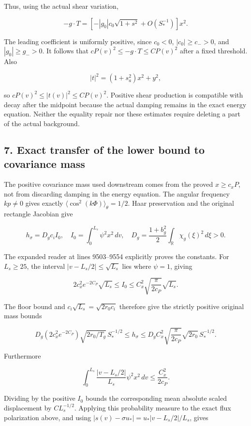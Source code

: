 \documentclass[10pt,a4paper]{article}
\begin{document}
Thus, using the actual shear variation,

\[
-g\cdot T=
\left[-|g_0|c_0\sqrt{1+s^2}+O(S_*^{-1})\right]x^2.
\]

The leading coefficient is uniformly positive, since \(c_0<0\), \(|c_0|\ge c_->0\), and \(|g_0|\ge g_->0\). It follows that \(cP(v)^2\le-g\cdot T\le CP(v)^2\) after a fixed threshold. Also

\[
|t|^2=(1+s_a^2)x^2+y^2,
\]

so \(cP(v)^2\le|t(v)|^2\le CP(v)^2\). Positive shear production is compatible with decay after the midpoint because the actual damping remains in the exact energy equation. Neither the equality repair nor these estimates require deleting a part of the actual background.

\subsection{7. Exact transfer of the lower bound to covariance mass}\label{gclosure:exact-transfer-of-the-lower-bound-to-covariance-mass}

The positive covariance mass used downstream comes from the proved \(x\ge c_xP\), not from discarding damping in the energy equation. The angular frequency \(kp\ne0\) gives exactly \(\langle\cos^2(k\Phi)\rangle_\theta=1/2\). Haar preservation and the original rectangle Jacobian give

\[
h_\sigma=D_gc_iI_0,\quad
I_0=\int_0^{L_s}\psi^2x^2\,dv,\quad
D_g=\frac{1+b_g^2}{2}\int_\mathbb R\chi_g(\xi)^2\,d\xi>0.
\]

The expanded reader at lines 9503--9554 explicitly proves the constants. For \(L_s\ge25\), the interval \(|v-L_s/2|\le\sqrt{L_s}\) lies where \(\psi=1\), giving

\[
2c_x^2e^{-2C_P}\sqrt{L_s}\le I_0
\le C_x^2\sqrt{\frac\pi{2c_P}}\sqrt{L_s}.
\]

The floor bound and \(c_i\sqrt{L_s}=\sqrt{2r_0c_i}\) therefore give the strictly positive original mass bounds

\[
D_g(2c_x^2e^{-2C_P})\sqrt{2r_0/T_g}\,S_*^{-1/2}
\le h_\sigma\le
D_gC_x^2\sqrt{\frac\pi{2c_P}}\sqrt{2r_0}\,S_*^{-1/2}.
\]

Furthermore

\[
\int_0^{L_s}\frac{|v-L_s/2|}{L_s}\psi^2x^2\,dv
\le\frac{C_x^2}{2c_P}.
\]

Dividing by the positive \(I_0\) bounds the corresponding mean absolute scaled displacement by \(CL_s^{-1/2}\). Applying this probability measure to the exact flux polarization above, and using \(|s(v)-\sigma u_*|=u_*|v-L_s/2|/L_s\), gives
\end{document}
